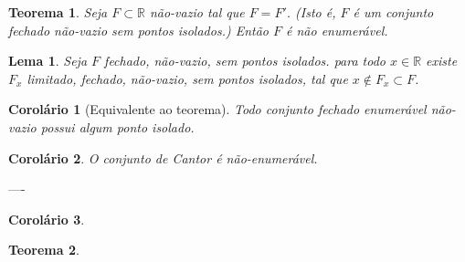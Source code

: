 \documentclass{article}
\theoremstyle{remark}
\theoremstyle{plain}
\newtheorem{theorem}{Teorema}
\theoremstyle{plain}
\newtheorem{corolary}{Corolário}
\theoremstyle{plain}
\newtheorem{lemma}{Lema}
\begin{document}
    \begin{theorem}
        Seja $F \subset \mathbb{R}$ não-vazio tal que $F = F'$. (Isto é, $F$ é um conjunto fechado não-vazio
        sem pontos isolados.) Então $F$ é não enumerável.
    \end{theorem}
    \begin{lemma}
        Seja $F$ fechado, não-vazio, sem pontos isolados. para todo $x \in \mathbb{R}$ 
        existe $F_x$ limitado, fechado, não-vazio, sem pontos isolados, tal que $x \not\in F_x \subset F$.
    \end{lemma}
    \begin{corolary}[Equivalente ao teorema]
        Todo conjunto fechado enumerável não-vazio possui algum ponto isolado.
    \end{corolary}
    \begin{corolary}
        O conjunto de Cantor é não-enumerável.
    \end{corolary}

    ----
    \begin{corolary}
    \end{corolary}
    
    \begin{theorem}
    \end{theorem}
    
\end{document}

